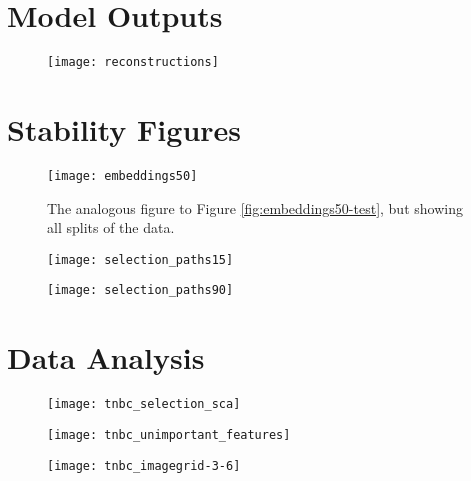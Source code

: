 \section{Model Outputs}

\begin{figure}
\texttt{[image: reconstructions]}
\caption{}
\label{fig:reconstructions}
\end{figure}

\section{Stability Figures}

\begin{figure}
  \centering
  \texttt{[image: embeddings50]}
  \caption{The analogous figure to Figure \ref{fig:embeddings50-test}, but
    showing all splits of the data.}
\end{figure}

\begin{figure}
  \centering
  \texttt{[image: selection\_paths15]}
  \caption{}
  \label{fig:}
\end{figure}


\begin{figure}
  \centering
  \texttt{[image: selection\_paths90]}
  \caption{}
  \label{fig:}
\end{figure}

\section{Data Analysis}

\begin{figure}
  \centering
  \texttt{[image: tnbc\_selection\_sca]}
\end{figure}


\begin{figure}
  \centering
  \texttt{[image: tnbc\_unimportant\_features]}
  \label{fig:tnbc_unimportant_features}
\end{figure}

\begin{figure}
  \centering
  \texttt{[image: tnbc\_imagegrid-3-6]}
  \label{fig:tnbc_imagegrid-3-6}
\end{figure}

